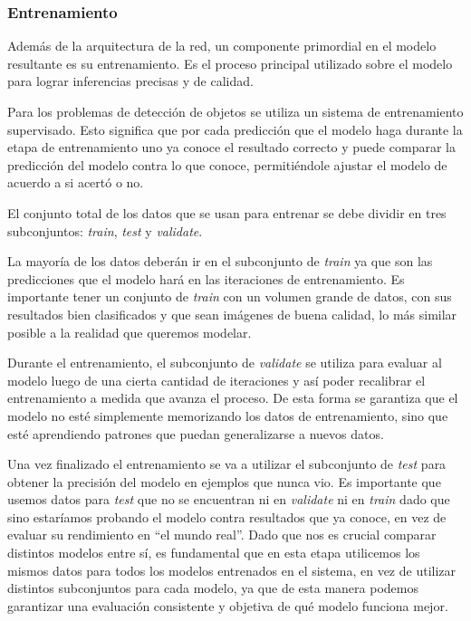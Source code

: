 \documentclass[a4paper]{article}
\begin{document}
\subsubsection{Entrenamiento}

Además de la arquitectura de la red, un componente primordial en el modelo resultante es su entrenamiento. Es el proceso principal utilizado sobre el modelo para lograr inferencias precisas y de calidad.

Para los problemas de detección de objetos se utiliza un sistema de entrenamiento supervisado. Esto significa que por cada predicción que el modelo haga durante la etapa de entrenamiento uno ya conoce el resultado correcto y puede comparar la predicción del modelo contra lo que conoce, permitiéndole ajustar el modelo de acuerdo a si acertó o no.

El conjunto total de los datos que se usan para entrenar se debe dividir en tres subconjuntos: \textit{train}, \textit{test} y \textit{validate}.\medskip

La mayoría de los datos deberán ir en el subconjunto de \textit{train} ya que son las predicciones que el modelo hará en las iteraciones de entrenamiento. Es importante tener un conjunto de \textit{train} con un volumen grande de datos, con sus resultados bien clasificados y que sean imágenes de buena calidad, lo más similar posible a la realidad que queremos modelar.

Durante el entrenamiento, el subconjunto de \textit{validate} se utiliza para evaluar al modelo luego de una cierta cantidad de iteraciones y así poder recalibrar el entrenamiento a medida que avanza el proceso. De esta forma se garantiza que el modelo no esté simplemente memorizando los datos de entrenamiento, sino que esté aprendiendo patrones que puedan generalizarse a nuevos datos.

Una vez finalizado el entrenamiento se va a utilizar el subconjunto de \textit{test} para obtener la precisión del modelo en ejemplos que nunca vio. Es importante que usemos datos para \textit{test} que no se encuentran ni en \textit{validate} ni en \textit{train} dado que sino estaríamos probando el modelo contra resultados que ya conoce, en vez de evaluar su rendimiento en ``el mundo real''. Dado que nos es crucial comparar distintos modelos entre sí, es fundamental que en esta etapa utilicemos los mismos datos para todos los modelos entrenados en el sistema, en vez de utilizar distintos subconjuntos para cada modelo, ya que de esta manera podemos garantizar una evaluación consistente y objetiva de qué modelo funciona mejor.\medskip
\end{document}
